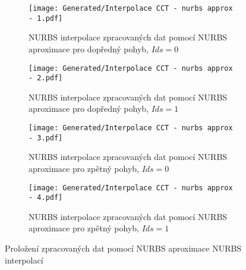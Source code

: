 \begin{landscapeimagepage}
    \begin{figure}[H]
        \centering
        \begin{subfigure}{.5\textheight}
            \centering
            \texttt{[image: Generated/Interpolace CCT - nurbs approx - 1.pdf]}
            \caption{NURBS interpolace zpracovaných dat pomocí NURBS aproximace pro dopředný pohyb, $Ids = 0$}
            \label{fig: NURBS interpolace zpracovaných dat pomocí NURBS aproximace pro dopředný pohyb, Ids = 0 m}
        \end{subfigure}
        \vspace{0.5cm}
        \hspace{2.5cm}
        \begin{subfigure}{.5\textheight}
            \centering
            \texttt{[image: Generated/Interpolace CCT - nurbs approx - 2.pdf]}
            \caption{NURBS interpolace zpracovaných dat pomocí NURBS aproximace pro dopředný pohyb, $Ids = 1$}
            \label{fig: NURBS interpolace zpracovaných dat pomocí NURBS aproximace pro dopředný pohyb, Ids = 1 m}
        \end{subfigure}
        \vspace{0.5cm}
        \begin{subfigure}{.5\textheight}
            \centering
            \texttt{[image: Generated/Interpolace CCT - nurbs approx - 3.pdf]}
            \caption{NURBS interpolace zpracovaných dat pomocí NURBS aproximace pro zpětný pohyb, $Ids = 0$}
            \label{fig: NURBS interpolace zpracovaných dat pomocí NURBS aproximace pro zpětný pohyb, Ids = 0 m}
        \end{subfigure}
        \hspace{2.5cm}
        \begin{subfigure}{.5\textheight}
            \centering
            \texttt{[image: Generated/Interpolace CCT - nurbs approx - 4.pdf]}
            \caption{NURBS interpolace zpracovaných dat pomocí NURBS aproximace pro zpětný pohyb, $Ids = 1$}
            \label{fig: NURBS interpolace zpracovaných dat pomocí NURBS aproximace pro zpětný pohyb, Ids = 1 m}
        \end{subfigure}
        \caption{Proložení zpracovaných dat pomocí NURBS aproximace NURBS interpolací}
        \label{}
    \end{figure}
\end{landscapeimagepage}